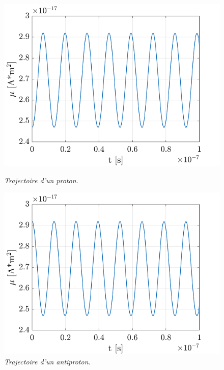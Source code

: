 \documentclass[a4paper,12pt,twoside]{article}
\begin{document}
\begin{figure}
\begin{minipage}[c]{.46\linewidth}
					\centering
					\includegraphics[scale = 0.6]{mm_p.png}
					\caption{\em\label{Fig: mm Prot} Trajectoire d'un proton.}
				\end{minipage}
				\hfill%
				\begin{minipage}[c]{.46\linewidth}
					\centering
					\includegraphics[scale = 0.6]{mm_ap.png}
					\caption{\em\label{Fig: mm Anti} Trajectoire d'un antiproton.}
				\end{minipage}
			\end{figure}
\end{document}

